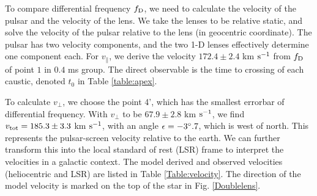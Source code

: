 \documentclass[useAMS,usenatbib]{mn2e}
\begin{document}
To compare differential frequency $f_{\rm D}$, we need to calculate the velocity of the pulsar and the velocity of the lens. We take the lenses to be relative static, and solve the velocity of the pulsar relative to the lens (in geocentric coordinate). The pulsar has two velocity components, and the two 1-D lenses effectively determine one component each.
For $v_{\parallel}$, we derive the velocity $172.4 \pm 2.4$ km $\rm s^{-1}$ from $f_{\rm D}$ of point $1$ in $0.4$ ms group.  The direct observable is the time to crossing of each caustic, denoted $t_0$ in Table \ref{table:apex}. 

To calculate $v_{\bot}$, we choose the point 4', which has the smallest errorbar of differential frequency.
With $v_{\bot}$ to be $67.9\pm 2.8$ km $\rm s^{-1}$, we find $v_{\rm
  tot}=185.3 \pm 3.3$ km $\rm s^{-1}$, with an angle
$\epsilon=-3\degree.7$, which is west of north. This represents the
pulsar-screen velocity relative to the earth.  We can further
transform this into the local standard of rest (LSR) frame to
interpret the velocities in a galactic context.
The model derived and observed velocities (heliocentric and LSR) are listed in Table \ref{Table:velocity}. The
direction of the model velocity is marked on the top of the star in
Fig. \ref{Doublelens}. 
\end{document}
